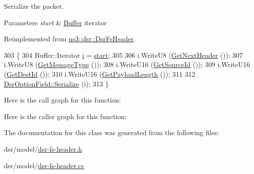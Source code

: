 Serialize the packet. 


\begin{DoxyParams}{Parameters}
{\em start} & \hyperlink{classns3_1_1Buffer}{Buffer} iterator \\
\hline
\end{DoxyParams}


Reimplemented from \hyperlink{classns3_1_1dsr_1_1DsrFsHeader_af8f508a2b05faac2b869d37fe672b911}{ns3\+::dsr\+::\+Dsr\+Fs\+Header}.


\begin{DoxyCode}
303 \{
304   Buffer::Iterator \hyperlink{bernuolliDistribution_8m_a6f6ccfcf58b31cb6412107d9d5281426}{i} = \hyperlink{namespacevisualizer_1_1core_a2a35e5d8a34af358b508dac8635754e0}{start};
305 
306   i.WriteU8 (\hyperlink{classns3_1_1dsr_1_1DsrFsHeader_aff0f05ec49bde5ba47d202494f537d72}{GetNextHeader} ());
307   i.WriteU8 (\hyperlink{classns3_1_1dsr_1_1DsrFsHeader_ac782397dd7797f91623f64ac38cd6ed2}{GetMessageType} ());
308   i.WriteU16 (\hyperlink{classns3_1_1dsr_1_1DsrFsHeader_a37a497f8e8a46f1de8b8b9e8df4f5a85}{GetSourceId} ());
309   i.WriteU16 (\hyperlink{classns3_1_1dsr_1_1DsrFsHeader_ab7f416f0c7f37cc143d482e18712a91f}{GetDestId} ());
310   i.WriteU16 (\hyperlink{classns3_1_1dsr_1_1DsrFsHeader_a30db4a1349e5519f7cd31a9a06e7615c}{GetPayloadLength} ());
311 
312   \hyperlink{classns3_1_1dsr_1_1DsrOptionField_a86d85db49c9330a24cd79a024e08218e}{DsrOptionField::Serialize} (i);
313 \}
\end{DoxyCode}


Here is the call graph for this function\+:




Here is the caller graph for this function\+:




The documentation for this class was generated from the following files\+:\begin{DoxyCompactItemize}
\item 
dsr/model/\hyperlink{dsr-fs-header_8h}{dsr-\/fs-\/header.\+h}\item 
dsr/model/\hyperlink{dsr-fs-header_8cc}{dsr-\/fs-\/header.\+cc}\end{DoxyCompactItemize}
